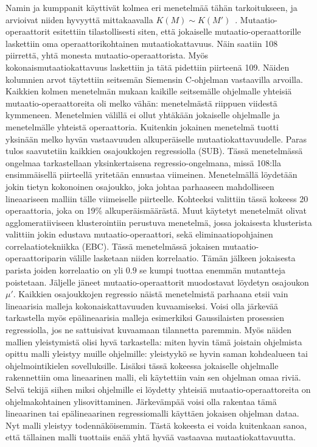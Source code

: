 \documentclass{tktltiki}
\begin{document}
Namin ja kumppanit käyttivät kolmea eri menetelmää tähän tarkoitukseen, ja arvioivat niiden hyvyyttä mittakaavalla $K(M) \sim K(M')$~\cite{NaminA06}. Mutaatio-operaattorit esitettiin tilastollisesti siten, että jokaiselle mutaatio-operaattorille laskettiin oma operaattorikohtainen mutaatiokattavuus. Näin saatiin 108 piirrettä, yhtä monesta mutaatio-operaattorista. Myös kokonaismutaatiokattavuus laskettiin ja tätä pidettiin piirteenä 109. Näiden kolumnien arvot täytettiin seitsemän Siemensin C-ohjelman vastaavilla arvoilla. Kaikkien kolmen menetelmän mukaan kaikille seitsemälle ohjelmalle yhteisiä mutaatio-operaattoreita oli melko vähän: menetelmästä riippuen viidestä kymmeneen. Menetelmien välillä ei ollut yhtäkään jokaiselle ohjelmalle ja menetelmälle yhteistä operaattoria. Kuitenkin jokainen menetelmä tuotti yksinään melko hyvän vastaavuuden alkuperäiselle mutaatiokattavuudelle. Paras tulos saavutetiin kaikkien osajoukkojen regressiolla (SUB). Tässä menetelmässä ongelmaa tarkastellaan yksinkertaisena regressio-ongelmana, missä 108:lla ensimmäisellä piirteellä yritetään ennustaa viimeinen. Menetelmällä löydetään jokin tietyn kokonoinen osajoukko, joka johtaa parhaaseen mahdolliseen lineaariseen malliin tälle viimeiselle piirteelle. Kohteeksi valittiin tässä kokeess 20 operaattoria, joka on 19\% alkuperäismäärästä. Muut käytetyt menetelmät olivat agglomeratiiviseen klusterointiin perustuva menetelmä, jossa jokaisesta klusterista valittiin jokin edustava mutaatio-operaattori, sekä eliminaatiopohjainen correlaatiotekniikka (EBC). Tässä menetelmässä jokaisen mutaatio-operaattoriparin välille lasketaan niiden korrelaatio. Tämän jälkeen jokaisesta parista joiden korrelaatio on yli $0.9$ se kumpi tuottaa enemmän mutantteja poistetaan. Jäljelle jäneet mutaatio-operaattorit muodostavat löydetyn osajoukon $\mu'$. Kaikkien osajoukkojen regressio näistä menetelmistä parhaana etsii vain lineaarisia malleja kokonaiskattavuuden kuvaamiseksi. Voisi olla järkevää tarkastella myös epälineaarisia malleja esimerkiksi Gaussilaisten prosessien regressiolla, jos ne sattuisivat kuvaamaan tilannetta paremmin. Myös näiden mallien yleistymistä olisi hyvä tarkastella: miten hyvin tämä joistain ohjelmista opittu malli yleistyy muille ohjelmille: yleistyykö se hyvin saman kohdealueen tai ohjelmointikielen sovelluksille. Lisäksi tässä kokeessa jokaiselle ohjelmalle rakennettiin oma lineaarinen malli, eli käytettiin vain sen ohjelman omaa riviä. Selvä tekijä siihen miksi ohjelmille ei löydetty yhteisiä mutaatio-operaattoreita on ohjelmakohtainen ylisovittaminen. Järkevämpää voisi olla rakentaa tämä lineaarinen tai epälineaarinen regressiomalli käyttäen jokaisen ohjelman dataa. Nyt malli yleistyy todennäköisemmin. Tästä kokeesta ei voida kuitenkaan sanoa, että tällainen malli tuottaiis enää yhtä hyvää vastaavaa mutaatiokattavuutta.
\end{document}
